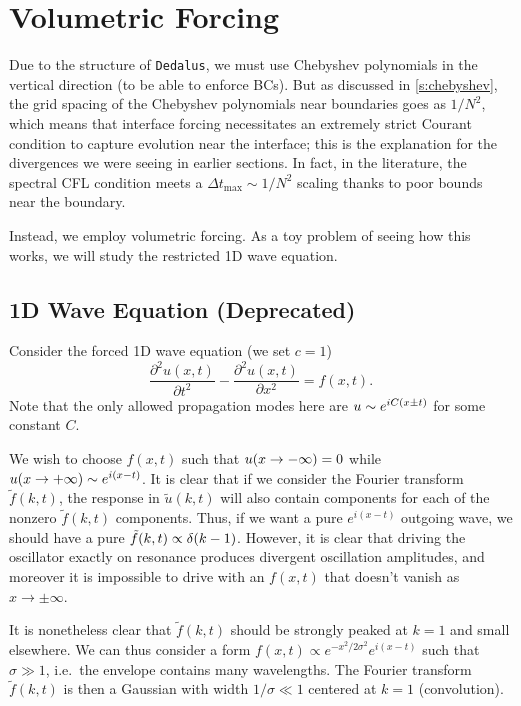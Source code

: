 \documentclass[11pt,
        usenames, %
        dvipsnames %
    ]{report}
\newcommand*{\ptd}[2]{\frac{\partial^2 #1}{\partial#2^2}}
\DeclarePairedDelimiter\p{\lparen}{\rparen}
\begin{document}
\section{Volumetric Forcing}

Due to the structure of \lstinline{Dedalus}, we must use Chebyshev polynomials
in the vertical direction (to be able to enforce BCs). But as discussed in
\autoref{s:chebyshev}, the grid spacing of the Chebyshev polynomials near
boundaries goes as $1/N^2$, which means that interface forcing necessitates an
extremely strict Courant condition to capture evolution near the interface; this
is the explanation for the divergences we were seeing in earlier sections. In
fact, in the literature, the spectral CFL condition meets a $\Delta t_{\max}
\sim 1/N^2$ scaling thanks to poor bounds near the boundary.

Instead, we employ volumetric forcing. As a toy problem of seeing how this
works, we will study the restricted 1D wave equation.

\subsection{1D Wave Equation (Deprecated)}

Consider the forced 1D wave equation (we set $c = 1$)
\begin{equation}
    \ptd{u(x, t)}{t} - \ptd{u(x, t)}{x} = f(x, t).
\end{equation}
Note that the only allowed propagation modes here are $u \sim e^{iC\p*{x \pm
t}}$ for some constant $C$.

We wish to choose $f(x, t)$ such that $u\p*{x \to -\infty} = 0$ while $u\p*{x
\to +\infty} \sim e^{i\p*{x - t}}$. It is clear that if we consider the Fourier
transform $\tilde{f}(k, t)$, the response in $\tilde{u}(k, t)$ will also contain
components for each of the nonzero $\tilde{f}(k, t)$ components. Thus, if we
want a pure $e^{i(x - t)}$ outgoing wave, we should have a pure $\tilde{f}(k, t)
\propto \delta\p*{k - 1}$. However, it is clear that driving the oscillator
exactly on resonance produces divergent oscillation amplitudes, and moreover it
is impossible to drive with an $f(x, t)$ that doesn't vanish as $x \to \pm
\infty$.

It is nonetheless clear that $\tilde{f}(k, t)$ should be strongly peaked at $k =
1$ and small elsewhere. We can thus consider a form $f(x, t) \propto
e^{-x^2/2\sigma^2} e^{i(x - t)}$ such that $\sigma \gg 1$, i.e.\ the envelope
contains many wavelengths. The Fourier transform $\tilde{f}(k, t)$ is then a
Gaussian with width $1/\sigma \ll 1$ centered at $k = 1$ (convolution).
\end{document}
